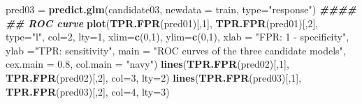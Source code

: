 \documentclass[
]{book}
\newenvironment{Shaded}{\begin{snugshade}}{\end{snugshade}}
\newcommand{\AttributeTok}[1]{\textcolor[rgb]{0.13,0.29,0.53}{#1}}
\newcommand{\DecValTok}[1]{\textcolor[rgb]{0.00,0.00,0.81}{#1}}
\newcommand{\DocumentationTok}[1]{\textcolor[rgb]{0.56,0.35,0.01}{\textbf{\textit{#1}}}}
\newcommand{\FloatTok}[1]{\textcolor[rgb]{0.00,0.00,0.81}{#1}}
\newcommand{\FunctionTok}[1]{\textcolor[rgb]{0.13,0.29,0.53}{\textbf{#1}}}
\newcommand{\NormalTok}[1]{#1}
\newcommand{\OtherTok}[1]{\textcolor[rgb]{0.56,0.35,0.01}{#1}}
\newcommand{\StringTok}[1]{\textcolor[rgb]{0.31,0.60,0.02}{#1}}
\begin{document}
\begin{Shaded}
\begin{Highlighting}[]
\NormalTok{pred03 }\OtherTok{=} \FunctionTok{predict.glm}\NormalTok{(candidate03, }\AttributeTok{newdata =}\NormalTok{ train, }\AttributeTok{type=}\StringTok{"response"}\NormalTok{)}
\DocumentationTok{\#\#\#\#}
\DocumentationTok{\#\# ROC curve}
 \FunctionTok{plot}\NormalTok{(}\FunctionTok{TPR.FPR}\NormalTok{(pred01)[,}\DecValTok{1}\NormalTok{], }\FunctionTok{TPR.FPR}\NormalTok{(pred01)[,}\DecValTok{2}\NormalTok{], }
      \AttributeTok{type=}\StringTok{"l"}\NormalTok{, }\AttributeTok{col=}\DecValTok{2}\NormalTok{, }\AttributeTok{lty=}\DecValTok{1}\NormalTok{, }\AttributeTok{xlim=}\FunctionTok{c}\NormalTok{(}\DecValTok{0}\NormalTok{,}\DecValTok{1}\NormalTok{), }\AttributeTok{ylim=}\FunctionTok{c}\NormalTok{(}\DecValTok{0}\NormalTok{,}\DecValTok{1}\NormalTok{),}
      \AttributeTok{xlab =} \StringTok{"FPR: 1 {-} specificity"}\NormalTok{,}
      \AttributeTok{ylab =}\StringTok{"TPR: sensitivity"}\NormalTok{,}
      \AttributeTok{main =} \StringTok{"ROC curves of the three candidate models"}\NormalTok{,}
      \AttributeTok{cex.main =} \FloatTok{0.8}\NormalTok{,}
      \AttributeTok{col.main =} \StringTok{"navy"}\NormalTok{)}
 \FunctionTok{lines}\NormalTok{(}\FunctionTok{TPR.FPR}\NormalTok{(pred02)[,}\DecValTok{1}\NormalTok{], }\FunctionTok{TPR.FPR}\NormalTok{(pred02)[,}\DecValTok{2}\NormalTok{],  }\AttributeTok{col=}\DecValTok{3}\NormalTok{, }\AttributeTok{lty=}\DecValTok{2}\NormalTok{)}
 \FunctionTok{lines}\NormalTok{(}\FunctionTok{TPR.FPR}\NormalTok{(pred03)[,}\DecValTok{1}\NormalTok{], }\FunctionTok{TPR.FPR}\NormalTok{(pred03)[,}\DecValTok{2}\NormalTok{],  }\AttributeTok{col=}\DecValTok{4}\NormalTok{, }\AttributeTok{lty=}\DecValTok{3}\NormalTok{)    }


\end{Highlighting}
\end{Shaded}
\end{document}
